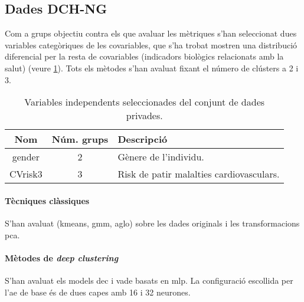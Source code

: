 \documentclass[CAT,BIB]{TFUOC}%
\begin{document}
        \subsection{Dades DCH-NG}
        \label{s:dades_privades}

            Com a grups objectiu contra els que avaluar les mètriques
            s'han seleccionat dues variables categòriques de les covariables,
            que s'ha trobat mostren una distribució diferencial per la resta de covariables
            (indicadors biològics relacionats amb la salut) (veure \cref{t:dadespriv_vars}).
            Tots els mètodes s'han avaluat fixant el número de clústers a 2 i 3.

            \begin{table}[h]
                \small
                \centering
                \begin{tabular}{@{}ccl@{}}
                    \toprule
                    \textbf{Nom} & \textbf{Núm. grups} & \textbf{Descripció}    \\ \midrule
                    gender       & 2 & Gènere de l'individu.                    \\
                    CVrisk3      & 3 & Risk de patir malalties cardiovasculars. \\
                    \bottomrule
                \end{tabular}
                \caption[Dades \gls{privades}: covariables seleccionades]{Variables independents seleccionades del conjunt de dades \gls{privades}.}
                \label{t:dadespriv_vars}
            \end{table}

            \paragraph{Tècniques clàssiques}
                S'han avaluat (\gls{kmeans}, \gls{gmm}, \gls{aglo})
                sobre les dades originals i les transformacions \gls{pca}.

            \paragraph{Mètodes de \textit{deep clustering}}
                S'han avaluat els models \gls{dec} i \gls{vade}
                basats en \gls{mlp}.
                La configuració escollida per l'\gls{ae} de base
                és de dues capes amb 16 i 32 neurones.
\end{document}
